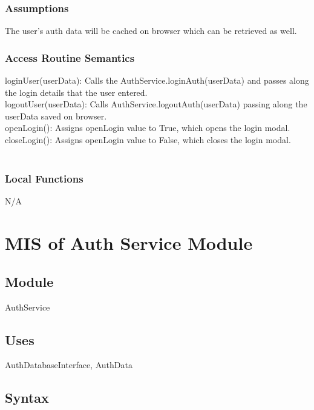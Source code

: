 \documentclass[12pt, titlepage]{article}
\begin{document}
	
	\subsubsection{Assumptions}
	The user's auth data will be cached on browser which can be retrieved as well.
	
	\subsubsection{Access Routine Semantics}
	
	\noindent loginUser(userData): Calls the AuthService.loginAuth(userData) and passes along the login details that the user entered. \\
	
	\noindent logoutUser(userData): Calls AuthService.logoutAuth(userData) passing along the userData saved on browser. \\
	
	\noindent openLogin(): Assigns openLogin value to True, which opens the login modal. \\
	
	\noindent closeLogin(): Assigns openLogin value to False, which closes the login modal. \\\\
	
	\subsubsection{Local Functions}
	
	N/A
	
	\newpage
	
	
	
	
	\section{MIS of Auth Service Module} \label{Module} 
	
	\subsection{Module}
	AuthService
	
	\subsection{Uses}
	AuthDatabaseInterface, AuthData
	
	\subsection{Syntax}
	
\end{document}
